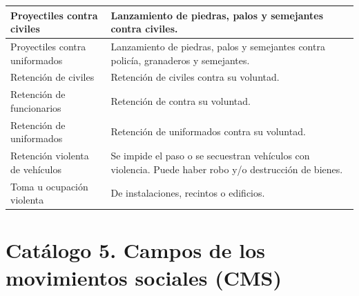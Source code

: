 \documentclass[letterpaper, 11pt]{book}
\theoremstyle{definition}
\theoremstyle{remark}
\begin{document}
{{{{{{{{{{\begin{footnotesize}
\begin{longtable}{| p{4cm}@{ } | p{11cm}@{ } |}
\hline
Proyectiles contra civiles & Lanzamiento de piedras, palos y semejantes contra civiles.\\
\hline
Proyectiles contra uniformados & Lanzamiento de piedras, palos y semejantes contra policía, granaderos y semejantes.\\
\hline
Retención de civiles &  Retención de civiles contra su voluntad.\\
\hline
Retención de funcionarios &  Retención de contra su voluntad.\\
\hline
Retención de uniformados &  Retención de uniformados contra su voluntad.\\
\hline
Retención violenta de vehículos & Se impide el paso o se secuestran vehículos con violencia. Puede haber robo y/o destrucción de bienes.\\
\hline
Toma u ocupación violenta & De instalaciones, recintos o edificios.\\
\hline
\end{longtable}
\end{footnotesize}
\newpage




\section*{Catálogo 5. Campos de los movimientos sociales (CMS)}
\label{Anexo_CMS}

}}}}}}}}}}
\end{document}
